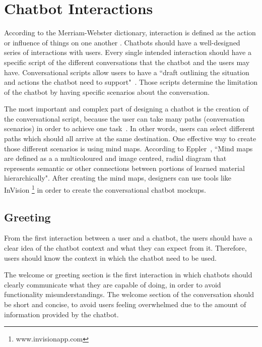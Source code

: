 \documentclass[a4paper,10pt]{article}
\begin{document}
\section{Chatbot Interactions}

According to the Merriam-Webster dictionary, interaction is defined as the action or influence of things on one another \cite{merriam-webster}.
Chatbots should have a well-designed series of interactions with users. Every single intended interaction should have a specific script of the different conversations that the chatbot and the users may have. Conversational scripts allow users to have a ``draft outlining the situation and actions the chatbot need to support"~\cite{CaseStudy}. Those scripts determine the limitation of the chatbot by having specific scenarios about the conversation. 

The most important and complex part of designing a chatbot is the creation of the conversational script, because the user can take many paths (conversation scenarios) in order to achieve one task~\cite{designChatbotConversatio}. In other words, users can select different paths which should all arrive at the same destination. One effective way to create those different scenarios is using mind maps. According to Eppler~\cite{eppler2006comparison}, ``Mind maps are defined as a a multicoloured and image centred, radial diagram that represents semantic or other connections between portions of learned material hierarchically". After creating the mind maps, designers can use tools like InVision \footnote{www.invisionapp.com} in order to create the conversational chatbot mockups.

\subsection{Greeting}
From the first interaction between a user and a chatbot, the users should have a clear idea of the chatbot context and what they can expect from it. Therefore, users should know the context in which the chatbot need to be used.

The welcome or greeting section is the first interaction in which chatbots should clearly communicate what they are capable of doing, in order to avoid functionality misunderstandings. 
The welcome section of the conversation should be short and concise, to avoid users feeling overwhelmed due to the amount of information provided by the chatbot. 
\end{document}

